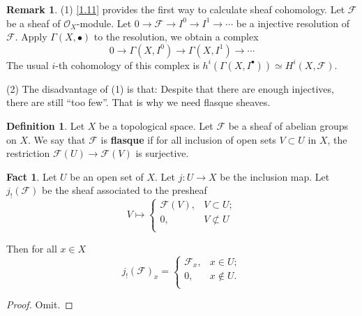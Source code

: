 \documentclass{amsart}
\numberwithin{equation}{section}
\theoremstyle{plain}
\theoremstyle{definition}
\newtheorem{defn}[equation]{Definition}
\newtheorem{fact}[equation]{Fact}
\newtheorem{rem}[equation]{Remark}
\begin{document}
\begin{rem}
 

	(1) \cref{1.11} provides the first way to calculate sheaf cohomology. 
	Let $ \mathscr F $ be a sheaf of $ \mathcal O_X $-module.
	Let $ 0\to \mathscr F\to I^0\to I^1\to \cdots $ be a injective resolution of $ \mathscr F $. 
	Apply $ \Gamma(X, \bullet) $ to the resolution, we obtain a complex 
	\[0\to \Gamma(X, I^0)\to \Gamma(X, I^1)\to \cdots\]
	The usual $ i $-th cohomology of this complex is $ h^i(\Gamma(X,I^{\bullet}))\simeq H^i(X, \mathscr F) $. 
	
	(2) The disadvantage of (1) is that: Despite that there are enough injectives, there are still ``too few''. 
	That is why we need flasque sheaves. 
\end{rem}

\begin{defn}\label{2.1}
	Let $ X $ be a topological space. 
	Let $ \mathscr F $ be a sheaf of abelian groups on $ X $. 
	We say that $ \mathscr F $ is \textbf{flasque} if for all inclusion of open sets $ V\subset U $ in $ X $, the restriction $ \mathscr F(U)\to \mathscr F(V) $ is surjective. 
\end{defn}

\begin{fact}\label{2.2}
	Let $ U $ be an open set of $ X $. 
	Let $ j: U\to X $  be the inclusion map. 
	Let $ j_!(\mathscr F) $ be the sheaf associated to the presheaf 
	$$
	V\mapsto \left\{
	\begin{array}{ll}
	\mathscr F(V),&V\subset U;\\
	0,&V\not\subset U\\
	\end{array}
	\right.
	$$
	
	Then for all $ x\in X $ 
	\[
	j_!(\mathscr F)_x=\left\{
	\begin{array}{ll}
	\mathscr F_x,&x\in U;\\
	0,&x\not\in U.\\
	\end{array}
	\right.
	\]
\end{fact}

\begin{proof}
	Omit. 
%	
%	
\end{proof}
\end{document}
